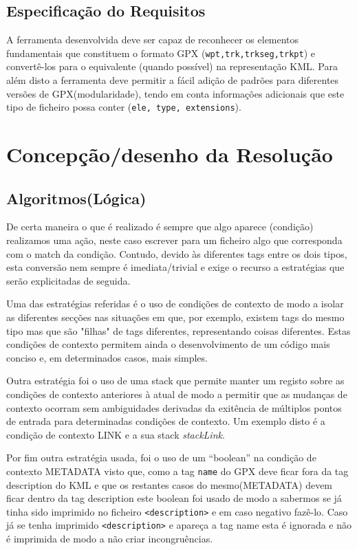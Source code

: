 \documentclass{llncs}
\begin{document}
\subsection{Especificação do Requisitos}
A ferramenta desenvolvida deve ser capaz de reconhecer os elementos fundamentais que constituem o formato GPX (\verb|wpt,trk,trkseg,trkpt|) e convertê-los para o equivalente (quando possível) na representação KML. Para além disto a ferramenta deve permitir a fácil adição de padrões para diferentes versões de GPX(modularidade), tendo em conta informações adicionais que este tipo de ficheiro possa conter (\verb|ele, type, extensions|).

\section{Concepção/desenho da Resolução}
\subsection{Algoritmos(Lógica)}
De certa maneira o que é realizado é sempre que algo aparece (condição) realizamos uma ação, neste caso escrever para um ficheiro algo que corresponda com o match da condição. Contudo, devido às diferentes tags entre os dois tipos, esta conversão nem sempre é imediata/trivial e exige o recurso a estratégias que serão explicitadas de seguida.

Uma das estratégias referidas é o uso de condições de contexto de modo a isolar as diferentes secções nas situações em que, por exemplo, existem tags do mesmo tipo mas que são "filhas" de tags diferentes, representando coisas diferentes. Estas condições de contexto permitem ainda o desenvolvimento de um código mais conciso e, em determinados casos, mais simples.

Outra estratégia foi o uso de uma stack que permite manter um registo sobre as condições de contexto anteriores à atual de modo a permitir que as mudanças de contexto ocorram sem ambiguidades derivadas da exitência de múltiplos pontos de entrada para determinadas condições de contexto. Um exemplo disto é a condição de contexto LINK e a sua stack \textit{stackLink}.

Por fim outra estratégia usada, foi o uso de um ``boolean'' na condição de contexto METADATA visto que, como a tag \texttt{name} do GPX deve ficar fora da tag description do KML e que os restantes casos do mesmo(METADATA) devem ficar dentro da tag description este boolean foi usado de modo a sabermos se já tinha sido imprimido no ficheiro \verb|<description>| e em caso negativo fazê-lo. Caso já se tenha imprimido \verb|<description>| e apareça a tag name esta é ignorada e não é imprimida de modo a não criar incongruências.
\end{document}
